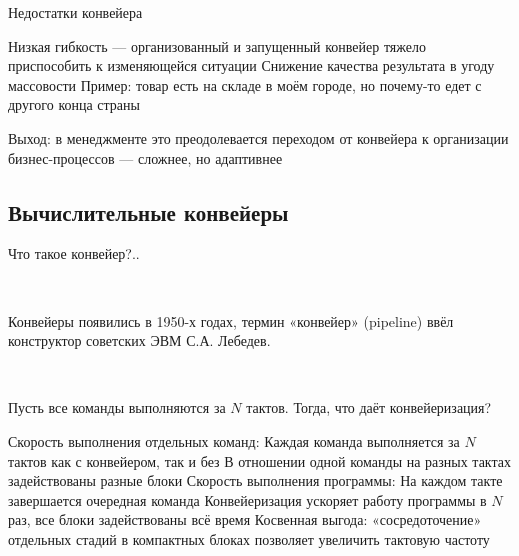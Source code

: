 \documentclass[xetex,aspectratio=43]{beamer}
\begin{document}
\begin{frame}{Недостатки конвейера}
    \begin{outline}[itemize]
        \1 Низкая гибкость — организованный и запущенный конвейер тяжело приспособить к изменяющейся ситуации
        \1 Снижение качества результата в угоду массовости
            \2 Пример: товар есть на складе в моём городе, но почему-то едет с другого конца страны
    \end{outline}
    \pause
    Выход: в менеджменте это преодолевается переходом от конвейера к организации бизнес-процессов — сложнее, но адаптивнее
\end{frame}

\subsection{Вычислительные конвейеры}

\begin{frame}{Что такое конвейер?..}

    ~

    Конвейеры появились в 1950-х годах, термин «конвейер» (pipeline) ввёл конструктор советских ЭВМ С.А. Лебедев.

    ~

    Пусть все команды выполняются за $N$ тактов. Тогда, что даёт конвейеризация?

    \begin{outline}[itemize]
        \1 Скорость выполнения отдельных команд:
            \2 Каждая команда выполняется за $N$ тактов как с конвейером, так и без
            \2 В отношении одной команды на разных тактах задействованы разные блоки
        \1 Скорость выполнения программы:
            \2 На каждом такте завершается очередная команда
            \2 Конвейеризация ускоряет работу программы в $N$ раз, все блоки задействованы всё время
            \pause
            \2 Косвенная выгода: «сосредоточение» отдельных стадий в компактных блоках позволяет увеличить тактовую частоту
    \end{outline}

\end{frame}
\end{document}
